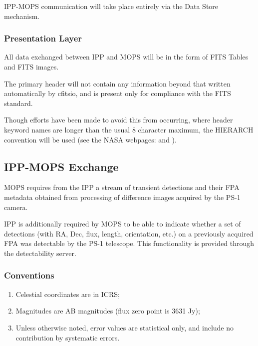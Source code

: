 \documentclass[panstarrs,spec]{panstarrs}
\begin{document}
IPP-MOPS communication will take place entirely via the Data Store
mechanism.

\subsubsection{Presentation Layer}

All data exchanged between IPP and MOPS will be in the form of FITS
Tables and FITS images.

The primary header will not contain any information beyond that
written automatically by cfitsio, and is present only for compliance
with the FITS standard.

Though efforts have been made to avoid this from occurring, where
header keyword names are longer than the usual 8 character maximum,
the HIERARCH convention will be used (see the NASA webpages:
and ).

\subsection{IPP-MOPS Exchange}

MOPS requires from the IPP a stream of transient detections and their
FPA metadata obtained from processing of difference images acquired by
the PS-1 camera. 

IPP is additionally required by MOPS to be able to indicate whether a
set of detections (with RA, Dec, flux, length, orientation, etc.) on a
previously acquired FPA was detectable by the PS-1 telescope. This
functionality is provided through the detectability server.

\subsubsection{Conventions}

\begin{enumerate}
\item Celestial coordinates are in ICRS;
\item Magnitudes are AB magnitudes (flux zero point is 3631 Jy);
\item Unless otherwise noted, error values are statistical only, and
  include no contribution by systematic errors.
\end{enumerate}
\end{document}
